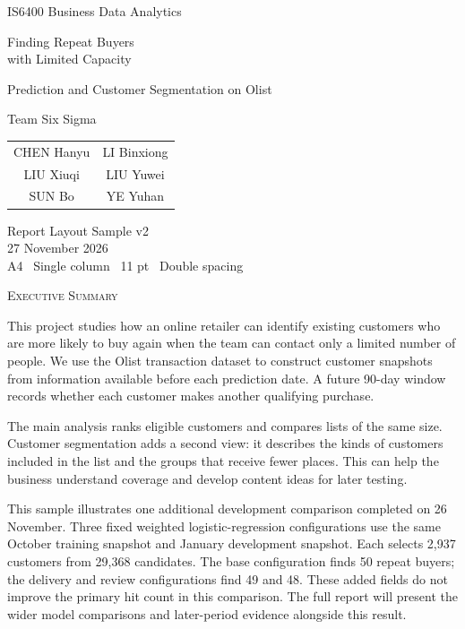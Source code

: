 \documentclass[11pt,a4paper,journal,onecolumn]{IEEEtran}
\renewcommand\normalsize{\fontsize{11bp}{22bp}\selectfont}
\begin{document}
\normalsize\pagestyle{sample}
\begin{center}
\vspace*{21mm}
{\fontsize{14bp}{22bp}\selectfont IS6400 Business Data Analytics\par}
\vspace{13mm}
{\fontsize{24bp}{30bp}\selectfont Finding Repeat Buyers\\with Limited Capacity\par}
\vspace{5mm}
{\fontsize{14bp}{22bp}\selectfont Prediction and Customer Segmentation on Olist\par}
\vspace{15mm}
{\fontsize{14bp}{22bp}\selectfont Team Six Sigma\par}
\vspace{5mm}
\begin{tabular}{cc}
CHEN Hanyu & LI Binxiong\\
LIU Xiuqi & LIU Yuwei\\
SUN Bo & YE Yuhan
\end{tabular}
\vspace{18mm}
\par Report Layout Sample v2\\
27 November 2026\\
A4 \textbullet\ Single column \textbullet\ 11 pt \textbullet\ Double spacing
\end{center}
\clearpage
\begin{center}\textsc{Executive Summary}\end{center}
This project studies how an online retailer can identify existing customers who are more likely to buy again when the team can contact only a limited number of people. We use the Olist transaction dataset to construct customer snapshots from information available before each prediction date. A future 90-day window records whether each customer makes another qualifying purchase.

The main analysis ranks eligible customers and compares lists of the same size. Customer segmentation adds a second view: it describes the kinds of customers included in the list and the groups that receive fewer places. This can help the business understand coverage and develop content ideas for later testing.

This sample illustrates one additional development comparison completed on 26 November. Three fixed weighted logistic-regression configurations use the same October training snapshot and January development snapshot. Each selects 2,937 customers from 29,368 candidates. The base configuration finds 50 repeat buyers; the delivery and review configurations find 49 and 48. These added fields do not improve the primary hit count in this comparison. The full report will present the wider model comparisons and later-period evidence alongside this result.
\end{document}
